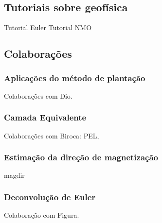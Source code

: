 \subsection{Tutoriais sobre geofísica}

Tutorial Euler
Tutorial NMO


\subsection{Colaborações}


\subsubsection{Aplicações do método de plantação}

Colaborações com Dio.


\subsubsection{Camada Equivalente}

Colaborações com Biroca: PEL,


\subsubsection{Estimação da direção de magnetização}

magdir


\subsubsection{Deconvolução de Euler}

Colaboração com Figura.
